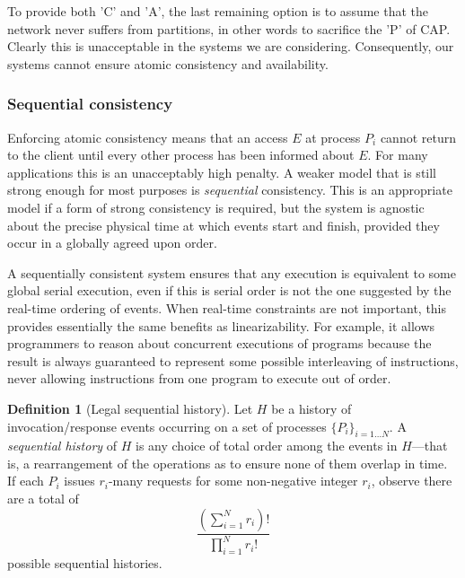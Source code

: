 \documentclass[]             %
{NASA}                       %
\theoremstyle{definition}
\newtheorem{definition}{Definition}[section]
\begin{document}
To provide both 'C' and 'A', the last remaining option is to assume
that the network never suffers from partitions, in other words to
sacrifice the 'P' of CAP. Clearly this is unacceptable in the systems
we are considering. Consequently, our systems cannot ensure atomic
consistency and availability.

\subsubsection{Sequential consistency}
\label{sequential-consistency}

Enforcing atomic consistency means that an access \(E\) at process
\(P_i\) cannot return to the client until every other process has been
informed about \(E\). For many applications this is an unacceptably
high penalty. A weaker model that is still strong enough for most
purposes is \emph{sequential} consistency. This is an appropriate
model if a form of strong consistency is required, but the system is
agnostic about the precise physical time at which events start and
finish, provided they occur in a globally agreed upon order.

A sequentially consistent system ensures that any execution is
equivalent to some global serial execution, even if this is serial order
is not the one suggested by the real-time ordering of events. When
real-time constraints are not important, this provides essentially the
same benefits as linearizability. For example, it allows programmers to
reason about concurrent executions of programs because the result is
always guaranteed to represent some possible interleaving of
instructions, never allowing instructions from one program to execute
out of order.

\begin{definition}[Legal sequential history]
Let $H$ be a history of invocation/response events occurring on a set
of processes $\{P_i\}_{i = 1 \ldots N}$. A \emph{sequential history}
of $H$ is any choice of total order among the events in $H$---that is,
a rearrangement of the operations as to ensure none of them overlap in
time. If each $P_i$ issues
$r_i$-many requests for some non-negative integer $r_i$, observe there
are a total of
\[
\frac{\left(\sum_{i = 1}^N r_i\right)!}{\prod_{i = 1}^N r_i!}
\]
possible sequential histories.
\end{definition}
\end{document}
